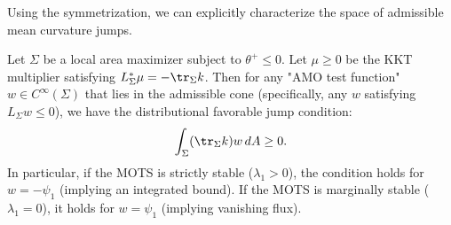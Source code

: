 Using the symmetrization, we can explicitly characterize the space of admissible mean curvature jumps.

\begin{proposition}\label{prop:InterfaceLemma_Spectral}
Let $\Sigma$ be a local area maximizer subject to $\theta^+ \le 0$. Let $\mu \ge 0$ be the KKT multiplier satisfying $L_\Sigma^* \mu = -\tr_\Sigma k$.
Then for any "AMO test function" $w \in C^\infty(\Sigma)$ that lies in the admissible cone (specifically, any $w$ satisfying $L_\Sigma w \le 0$), we have the distributional favorable jump condition:
\begin{equation}
    \int_\Sigma (\tr_\Sigma k) w \, dA \ge 0.
\end{equation}
In particular, if the MOTS is strictly stable ($\lambda_1 > 0$), the condition holds for $w = -\psi_1$ (implying an integrated bound). If the MOTS is marginally stable ($\lambda_1 = 0$), it holds for $w = \psi_1$ (implying vanishing flux).
\end{proposition}

